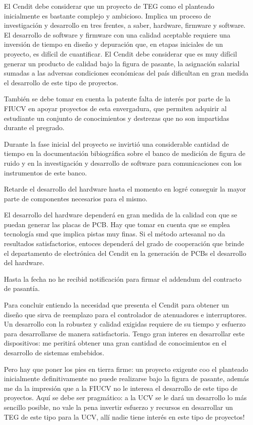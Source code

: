 \documentclass[paper=letter,oneside,fontsize=12pt, parskip=full]{article}
\begin{document}
	El Cendit debe considerar que un proyecto de TEG como el planteado inicialmente es bastante complejo y ambicioso. Implica un proceso de investigación y desarrollo en tres frentes, a saber, hardware, firmware y software. El desarrollo de software y firmware con una calidad aceptable requiere una inversión de tiempo en diseño y depuración que, en etapas iniciales de un proyecto, es difícil de cuantificar. El Cendit debe considerar que es muy difícil generar un producto de calidad bajo la figura de pasante, la asignación salarial sumadas a las adversas condiciones económicas del país dificultan en gran medida el desarrollo de este tipo de proyectos.
	
	También se debe tomar en cuenta la patente falta de interés por parte de la FIUCV en apoyar proyectos de esta envergadura, que permiten adquirir al estudiante un conjunto de conocimientos y destrezas que no son impartidas durante el pregrado.
	
	Durante la fase inicial del proyecto se invirtió una considerable cantidad de tiempo en la documentación bibiográfica sobre el banco de medición de figura de ruido y en la investigación y desarrollo de software para comunicaciones con los instrumentos de este banco. 
	
	Retarde el desarrollo del hardware hasta el momento en logré conseguir la mayor parte de componentes necesarios para el mismo. 
	
	El desarrollo del hardware dependerá en gran medida de la calidad con que se puedan generar las placas de PCB. Hay que tomar en cuenta que se emplea tecnología smd que implica pistas muy finas. Si el método artesanal no da resultados satisfactorios, entoces dependerá del grado de cooperación que brinde el departamento de electrónica del Cendit en la generación de PCBs el desarrollo del hardware.	
		
	Hasta la fecha no he recibid notificación para firmar el addendum del contracto de pasantía.
	
	Para concluir entiendo la necesidad que presenta el Cendit para obtener un diseño que sirva de reemplazo para el controlador de atenuadores e interruptores. Un desarrollo con la robustez y calidad exigidas requiere de su tiempo y esfuerzo para desarrollarse de manera satisfactoria. Tengo gran interes en desarrollar este dispositivos: me peritirá obtener una gran cantidad de conocimientos en el desarrollo de sistemas embebidos.
	
	Pero hay que poner los pies en tierra firme: un proyecto exigente coo el planteado inicialmente definitivamente no puede realizarse bajo la figura de pasante, además me da la impresión que a la FIUCV no le interesa el desarrollo de este tipo de proyectos. Aquí se debe ser pragmático: a la UCV se le dará un desarrollo lo más sencillo posible, no vale la pena invertir esfuerzo y recursos en desarrollar un TEG de este tipo para la UCV, allí nadie tiene interés en este tipo de proyectos!
	
\end{document}
